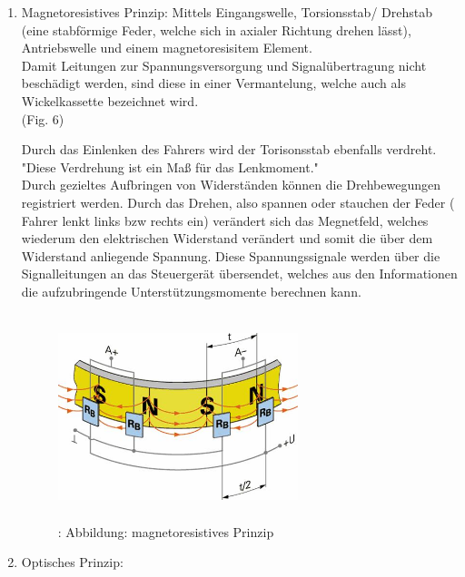 				\begin{enumerate}
					\item Magnetoresistives Prinzip:
							 Mittels Eingangswelle, Torsionsstab/ Drehstab (eine stabförmige Feder, welche sich in axialer Richtung drehen lässt), Antriebswelle und einem magnetoresisitem Element. \\
							 Damit Leitungen zur Spannungsversorgung und Signalübertragung nicht beschädigt werden, sind diese in einer Vermantelung, welche auch als Wickelkassette bezeichnet wird.\\ (Fig. 6)
							 
							 Durch das Einlenken des Fahrers wird der Torisonsstab ebenfalls verdreht. "Diese Verdrehung ist ein Maß für das Lenkmoment."\cite{TS_dreh}\\
							 Durch gezieltes Aufbringen von Widerständen können die Drehbewegungen registriert werden. Durch das Drehen, also spannen oder stauchen der Feder ( Fahrer lenkt links bzw rechts ein) verändert sich das Megnetfeld, welches wiederum den elektrischen Widerstand verändert und somit die über dem Widerstand anliegende Spannung. Diese Spannungssignale werden über die Signalleitungen an das Steuergerät übersendet, welches aus den Informationen die aufzubringende Unterstützungsmomente berechnen kann.				 

							\begin{figure}
								\centering
								\includegraphics[width=7cm, height=6cm] {lenkdrehmomentsensor.png}
								\caption {\cite{TS_dreh_pic_mag}: Abbildung: magnetoresistives Prinzip}
							\end{figure}			 

	
					\item Optisches Prinzip:


\end{enumerate}
